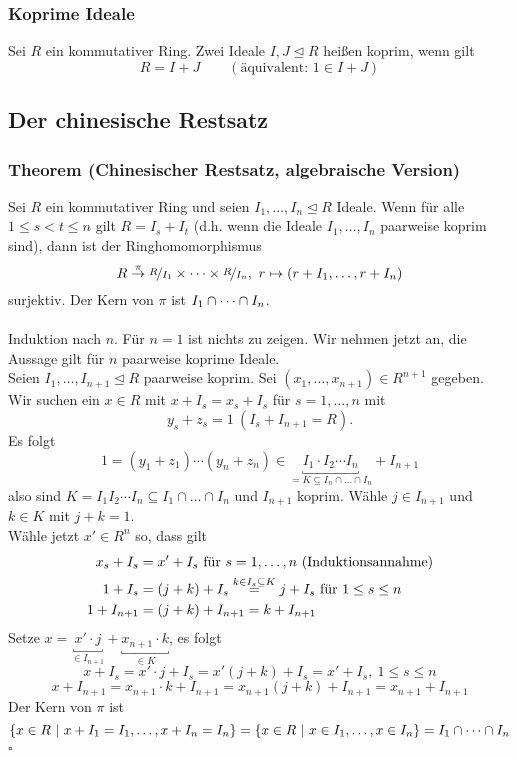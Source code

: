 \subsubsection*{Koprime Ideale}
Sei $R$ ein kommutativer Ring.
Zwei Ideale $I,J\trianglelefteq R$ heißen koprim, wenn gilt
\[
R=I+J \qquad(\text{äquivalent: } 1\in I+J)
\]

\subsection{Der chinesische Restsatz}
\label{sub:restsatz}
\subsubsection*{Theorem (Chinesischer Restsatz, algebraische Version)}
Sei $R$ ein kommutativer Ring und seien $I_1,\dots,I_n\trianglelefteq R$ Ideale.
Wenn für alle $1\le s<t\le n$ gilt $R=I_s+I_t$ (d.h. wenn die Ideale $I_1,\dots,I_n$ paarweise koprim sind), dann ist der Ringhomomorphismus
\[
R\stackrel{\pi}{\to}\nicefrac{R}{I_1}\times\dots\times \nicefrac{R}{I_n},~r\mapsto (r+I_1,\dots,r+I_n)
\]
surjektiv.
Der Kern von $\pi$ ist $I_1\cap \dots \cap I_n$.\\

\\
Induktion nach $n$.
Für $n=1$ ist nichts zu zeigen.
Wir nehmen jetzt an, die Aussage gilt für $n$ paarweise koprime Ideale.\\
Seien $I_1,\dots,I_{n+1}\trianglelefteq R$ paarweise koprim.
Sei $(x_1,\dots,x_{n+1})\in R^{n+1}$ gegeben.
Wir suchen ein $x\in R$ mit $x+I_s=x_s+I_s$ für $s=1,\dots,n$ mit
\[
y_s+z_s=1~(I_s+I_{n+1}=R).
\]
Es folgt
\[
1=(y_1+z_1)\cdots(y_n+z_n)\in \underbracket{I_1\cdot I_2\cdots I_n}_{=K\subseteq I_n\cap\dots\cap I_n}+I_{n+1}
\]
also sind $K=I_1I_2\cdots I_n\subseteq I_1\cap\dots\cap I_n$ und $I_{n+1}$ koprim.
Wähle $j\in I_{n+1}$ und $k\in K$ mit $j+k=1$.\\
Wähle jetzt $x'\in R^n$ so, dass gilt
\begin{equation*}
\begin{aligned}
	x_s+I_s &= x'+I_s\text{ für }s=1,\dots,n~(\text{Induktionsannahme})\\
	1+I_s &= (j+k)+I_s \stackrel{k\in I_s\subseteq K}{=} j+I_s \text{ für }1\le s \le n\\
	1+I_{n+1} &= (j+k)+I_{n+1} = k+I_{n+1}
\end{aligned}
\end{equation*}
Setze $x=\underbracket{x'\cdot j}_{\in I_{n+1}}+\underbracket{x_{n+1}\cdot k}_{\in K}$, es folgt
\[
x+I_s=x'\cdot j+I_s=x'(j+k)+I_s=x'+I_s,~1\le s\le n
\]
\[
x+I_{n+1}=x_{n+1}\cdot k+I_{n+1}=x_{n+1}(j+k)+I_{n+1}=x_{n+1}+I_{n+1}
\]
Der Kern von $\pi$ ist 
\[
\{x\in R~|~x+I_1=I_1,\dots, x+I_n=I_n \}=\{x\in R~|~x\in I_1,\dots,x\in I_n \}=I_1\cap \dots \cap I_n
\]
\hfill $\square$

